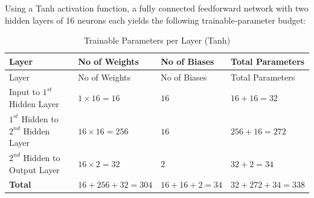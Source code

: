 \documentclass[
  number,
  preprint]{elsarticle}
\begin{document}
Using a Tanh activation function, a fully connected feedforward network
with two hidden layers of 16 neurons each yields the following
trainable-parameter budget:

\begin{longtable}[]{@{}
  >{\raggedright\arraybackslash}p{}
  >{\centering\arraybackslash}p{}
  >{\centering\arraybackslash}p{}
  >{\centering\arraybackslash}p{}@{}}
\caption{Trainable Parameters per Layer
(Tanh)}\label{tbl-ch3-trainable-tanh}\tabularnewline
\toprule\noalign{}
\begin{minipage}[b]{\linewidth}\raggedright
Layer
\end{minipage} & \begin{minipage}[b]{\linewidth}\centering
No of Weights
\end{minipage} & \begin{minipage}[b]{\linewidth}\centering
No of Biases
\end{minipage} & \begin{minipage}[b]{\linewidth}\centering
Total Parameters
\end{minipage} \\
\midrule\noalign{}
\endfirsthead
\toprule\noalign{}
\begin{minipage}[b]{\linewidth}\raggedright
Layer
\end{minipage} & \begin{minipage}[b]{\linewidth}\centering
No of Weights
\end{minipage} & \begin{minipage}[b]{\linewidth}\centering
No of Biases
\end{minipage} & \begin{minipage}[b]{\linewidth}\centering
Total Parameters
\end{minipage} \\
\midrule\noalign{}
\endhead
\bottomrule\noalign{}
\endlastfoot
Input to \(1^{st}\) Hidden Layer & \(1 \times 16 = 16\) & \(16\) &
\(16 + 16 = 32\) \\
\(1^{st}\) Hidden to \(2^{nd}\) Hidden Layer & \(16 \times 16 = 256\) &
\(16\) & \(256 + 16 = 272\) \\
\(2^{nd}\) Hidden to Output Layer & \(16 \times 2 = 32\) & \(2\) &
\(32 + 2 = 34\) \\
\textbf{Total} & \(16 + 256 + 32 = 304\) & \(16 + 16 + 2 = 34\) &
\(32 + 272 + 34 = 338\) \\
\end{longtable}
\end{document}

